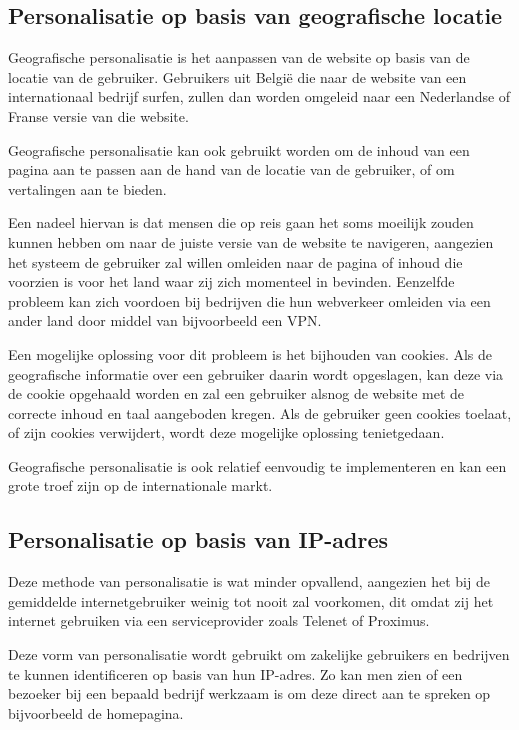 \subsection{Personalisatie op basis van geografische locatie}
\label{subsec:Personalisatie op basis van geografische locatie}

Geografische personalisatie is het aanpassen van de website op basis van de locatie van de gebruiker. Gebruikers uit België die naar de website van een internationaal bedrijf surfen, zullen dan worden omgeleid naar een Nederlandse of Franse versie van die website.

Geografische personalisatie kan ook gebruikt worden om de inhoud van een pagina aan te passen aan de hand van de locatie van de gebruiker, of om vertalingen aan te bieden.

Een nadeel hiervan is dat mensen die op reis gaan het soms moeilijk zouden kunnen hebben om naar de juiste versie van de website te navigeren, aangezien het systeem de gebruiker zal willen omleiden naar de pagina of inhoud die voorzien is voor het land waar zij zich momenteel in bevinden. Eenzelfde probleem kan zich voordoen bij bedrijven die hun webverkeer omleiden via een ander land door middel van bijvoorbeeld een VPN. 

Een mogelijke oplossing voor dit probleem is het bijhouden van cookies. Als de geografische informatie over een gebruiker daarin wordt opgeslagen, kan deze via de cookie opgehaald worden en zal een gebruiker alsnog de website met de correcte inhoud en taal aangeboden kregen. Als de gebruiker geen cookies toelaat, of zijn cookies verwijdert, wordt deze mogelijke oplossing tenietgedaan.

Geografische personalisatie is ook relatief eenvoudig te implementeren en kan een grote troef zijn op de internationale markt. 

\subsection{Personalisatie op basis van IP-adres}
\label{subsec:Personalisatie op basis van IP-adres}

Deze methode van personalisatie is wat minder opvallend, aangezien het bij de gemiddelde internetgebruiker weinig tot nooit zal voorkomen, dit omdat zij het internet gebruiken via een serviceprovider zoals Telenet of Proximus. 

Deze vorm van personalisatie wordt gebruikt om zakelijke gebruikers en bedrijven te kunnen identificeren op basis van hun IP-adres. Zo kan men zien of een bezoeker bij een bepaald bedrijf werkzaam is om deze direct aan te spreken op bijvoorbeeld de homepagina.

